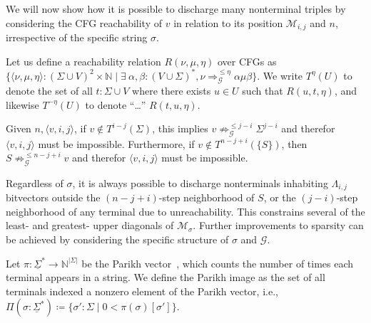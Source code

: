 \documentclass[sigplan,review,anonymous,acmsmall]{acmart}\settopmatter{printfolios=false,printccs=false,printacmref=false}
\begin{document}
We will now show how it is possible to discharge many nonterminal triples by considering the CFG reachability of $v$ in relation to its position $\mathcal{M}_{i, j}$ and $n$, irrespective of the specific string $\sigma$.

\begin{definition}[CFG reachability]
  Let us define a reachability relation $R(\nu, \mu, \eta)$ over CFGs as $\{\langle\nu, \mu, \eta\rangle: (\Sigma \cup V)^2\times\mathbb{N} \mid \exists\:\alpha, \beta: (V\cup\Sigma)^*, \nu \Rightarrow^{\leq \eta}_\mathcal{G} \alpha \mu \beta\}$. We write $T^\eta(U)$ to denote the set of all $t: \Sigma \cup V$ where there exists $u\in U$ such that $R(u, t, \eta)$, and likewise $T^{-\eta}(U)$ to denote ``\ldots'' $R(t, u, \eta)$.
\end{definition}

\begin{lemma}
  Given $n, \langle v, i, j \rangle$, if $v \notin T^{i-j}(\Sigma)$, this implies $v\not\Rightarrow^{\leq j-i}_\mathcal{G} \Sigma^{j-i}$ and therefor $\langle v, i, j \rangle$ must be impossible. Furthermore, if $v \notin T^{n-j+i}(\{S\})$, then $S\not\Rightarrow^{\leq n-j+i}_\mathcal{G} v$ and therefor $\langle v, i, j \rangle$ must be impossible.
\end{lemma}

Regardless of $\sigma$, it is always possible to discharge nonterminals inhabiting $\Lambda_{i, j}$ bitvectors outside the $(n-j+i)$-step neighborhood of $S$, or the $(j-i)$-step neighborhood of any terminal due to unreachability. This constrains several of the least- and greatest- upper diagonals of $\mathcal{M}_\sigma$. Further improvements to sparsity can be achieved by considering the specific structure of $\sigma$ and $\mathcal{G}$.

\begin{definition}
  Let $\pi: \underline\Sigma^*\rightarrow\mathbb{N}^{|\Sigma|}$ be the Parikh vector~\cite{parikh1966context}, which counts the number of times each terminal appears in a string. We define the Parikh image as the set of all terminals indexed a nonzero element of the Parikh vector, i.e., $\Pi(\sigma:\underline\Sigma^*) \coloneqq \{\sigma': \Sigma \mid 0 < \pi(\sigma)[\sigma']\}$. %
\end{definition}
\end{document}
